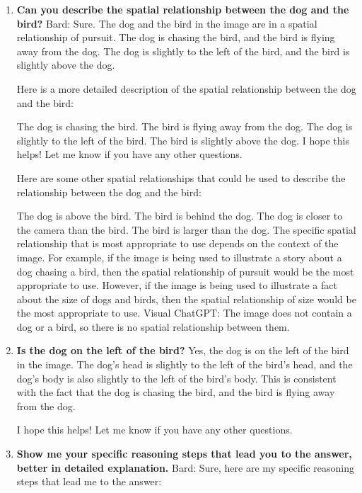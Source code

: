    \begin{enumerate}
        \item \textbf{Can you describe the spatial relationship between the dog and the bird?}
        \subitem Bard: 
        Sure. The dog and the bird in the image are in a spatial relationship of pursuit. The dog is chasing the bird, and the bird is flying away from the dog. The dog is slightly to the left of the bird, and the bird is slightly above the dog.

        Here is a more detailed description of the spatial relationship between the dog and the bird:

        The dog is chasing the bird.
        The bird is flying away from the dog.
        The dog is slightly to the left of the bird.
        The bird is slightly above the dog.
        I hope this helps! Let me know if you have any other questions.

        Here are some other spatial relationships that could be used to describe the relationship between the dog and the bird:

        The dog is above the bird.
        The bird is behind the dog.
        The dog is closer to the camera than the bird.
        The bird is larger than the dog.
        The specific spatial relationship that is most appropriate to use depends on the context of the image. For example, if the image is being used to illustrate a story about a dog chasing a bird, then the spatial relationship of pursuit would be the most appropriate to use. However, if the image is being used to illustrate a fact about the size of dogs and birds, then the spatial relationship of size would be the most appropriate to use.
        \subitem Visual ChatGPT: The image does not contain a dog or a bird, so there is no spatial relationship between them.
        \item \textbf{Is the dog on the left of the bird?}
        \subitem Yes, the dog is on the left of the bird in the image. The dog's head is slightly to the left of the bird's head, and the dog's body is also slightly to the left of the bird's body. This is consistent with the fact that the dog is chasing the bird, and the bird is flying away from the dog.

        I hope this helps! Let me know if you have any other questions.
        \item \textbf{Show me your specific reasoning steps that lead you to the answer, better in detailed explanation.}
        \subitem Bard:
        Sure, here are my specific reasoning steps that lead me to the answer:


\end{enumerate}
